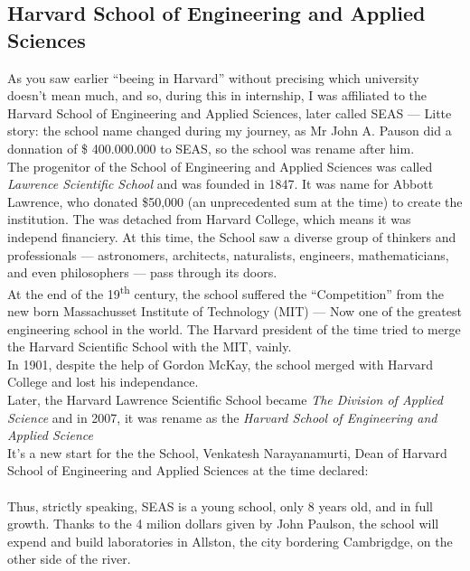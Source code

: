 \documentclass[10pt,a4paper]{article}
\begin{document}
\subsection{Harvard School of Engineering and Applied Sciences}
As you saw earlier ``beeing in Harvard'' without precising which university doesn't mean much, and so, during this in internship, I was affiliated to the Harvard School of Engineering and Applied Sciences, later called SEAS — Litte story: the school name changed during my journey, as Mr John A. Pauson did a donnation of \$ 400.000.000 to SEAS, so the school was rename after him.\\

The progenitor of the School of Engineering and Applied Sciences was called \textit{Lawrence Scientific School} and was founded in 1847. It was name for Abbott Lawrence, who donated \$50,000 (an unprecedented sum at the time) to create the institution. The was detached from Harvard College, which means it was independ financiery.
At this time, the School saw a diverse group of thinkers and professionals — astronomers, architects, naturalists, engineers, mathematicians, and even philosophers — pass through its doors.\\
At the end of the 19\textsuperscript{th} century, the school suffered the ``Competition'' from the new born Massachusset Institute of Technology (MIT) — Now one of the greatest engineering school in the world. The Harvard president of the time tried to merge the Harvard Scientific School with the MIT, vainly.\\
In 1901, despite the help of Gordon McKay, the school merged with Harvard College and lost his independance.\\

Later, the Harvard Lawrence Scientific School became \textit{The Division of Applied Science} and in 2007, it was rename as the \textit{Harvard School of Engineering and Applied Science}\\
It's a new start for the the School, Venkatesh Narayanamurti, Dean of Harvard School of Engineering and Applied Sciences at the time declared:\\
\\

Thus, strictly speaking, SEAS is a young school, only 8 years old, and in full growth. Thanks to the 4 milion dollars given by John Paulson, the school will expend and build laboratories in Allston, the city bordering Cambrigdge, on the other side of the river.\\
\end{document}
